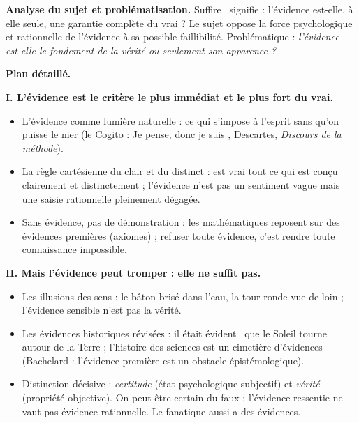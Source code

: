 \documentclass[11pt]{article}
\begin{document}
\begin{corrige}
\textbf{Analyse du sujet et problématisation.} \guillemotleft Suffire \guillemotright\ signifie : l'évidence est-elle, à elle seule, une garantie complète du vrai ? Le sujet oppose la force psychologique et rationnelle de l'évidence à sa possible faillibilité. Problématique : \emph{l'évidence est-elle le fondement de la vérité ou seulement son apparence ?}

\textbf{Plan détaillé.}

\textbf{I. L'évidence est le critère le plus immédiat et le plus fort du vrai.}
\begin{itemize}
\item L'évidence comme lumière naturelle : ce qui s'impose à l'esprit sans qu'on puisse le nier (le Cogito : \guillemotleft Je pense, donc je suis \guillemotright, Descartes, \emph{Discours de la méthode}).
\item La règle cartésienne du clair et du distinct : est vrai tout ce qui est conçu clairement et distinctement ; l'évidence n'est pas un sentiment vague mais une saisie rationnelle pleinement dégagée.
\item Sans évidence, pas de démonstration : les mathématiques reposent sur des évidences premières (axiomes) ; refuser toute évidence, c'est rendre toute connaissance impossible.
\end{itemize}

\textbf{II. Mais l'évidence peut tromper : elle ne suffit pas.}
\begin{itemize}
\item Les illusions des sens : le bâton brisé dans l'eau, la tour ronde vue de loin ; l'évidence sensible n'est pas la vérité.
\item Les évidences historiques révisées : il était \guillemotleft évident \guillemotright\ que le Soleil tourne autour de la Terre ; l'histoire des sciences est un cimetière d'évidences (Bachelard : l'évidence première est un obstacle épistémologique).
\item Distinction décisive : \emph{certitude} (état psychologique subjectif) et \emph{vérité} (propriété objective). On peut être certain du faux ; l'évidence ressentie ne vaut pas évidence rationnelle. Le fanatique aussi a des évidences.
\end{itemize}


\end{corrige}
\end{document}
